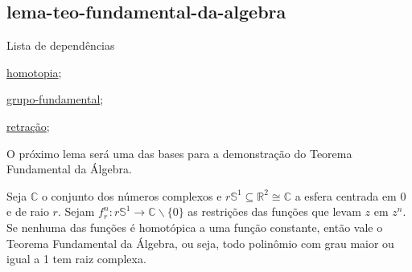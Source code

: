 \subsection{lema-teo-fundamental-da-algebra} 
\label{lema-teo-fundamental-da-algebra}
\begin{titlemize}{Lista de dependências}
	\item \hyperref[homotopia]{homotopia};\\  
	\item \hyperref[grupo-fundamental]{grupo-fundamental};\\
    \item \hyperref[retração]{retração};

\end{titlemize}
O próximo lema será uma das bases para a demonstração do Teorema Fundamental da Álgebra.
\begin{thm}[Lema] 
	Seja $\mathbb{C}$ o conjunto dos números complexos e $r\mathbb{S}^1 \subseteq \mathbb{R}^2 \cong \mathbb{C}$ a esfera centrada em 0 e de raio $r$. Sejam $f_r^n: r\mathbb{S}^1 \rightarrow \mathbb{C}\backslash \{0\}$ as restrições das funções que levam $z$ em $z^n$. Se nenhuma das funções é homotópica a uma função constante, então vale o Teorema Fundamental da Álgebra, ou seja, todo polinômio com grau maior ou igual a 1 tem raiz complexa.
	
\end{thm}

